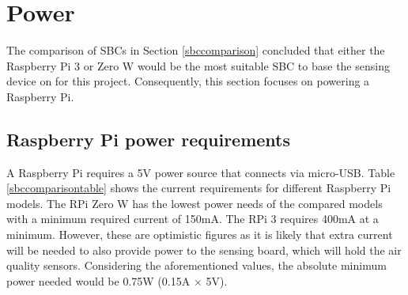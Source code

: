 \documentclass[11pt,twosided,a4paper]{report}
\begin{document}


\section{Power} \label{power}

The comparison of SBCs in Section \ref{sbccomparison} concluded that either the Raspberry Pi 3 or Zero W would be the most suitable SBC to base the sensing device on for this project. Consequently, this section focuses on powering a Raspberry Pi.

\subsection{Raspberry Pi power requirements}


A Raspberry Pi requires a 5V power source that connects via micro-USB. Table \ref{sbccomparisontable} shows the current requirements for different Raspberry Pi models. The RPi Zero W has the lowest power needs of the compared models with a minimum required current of 150mA. The RPi 3 requires 400mA at a minimum. However, these are optimistic figures as it is likely that extra current will be needed to also provide power to the sensing board, which will hold the air quality sensors. Considering the aforementioned values, the absolute minimum power needed would be 0.75W (0.15A $\times$ 5V).


\end{document}
